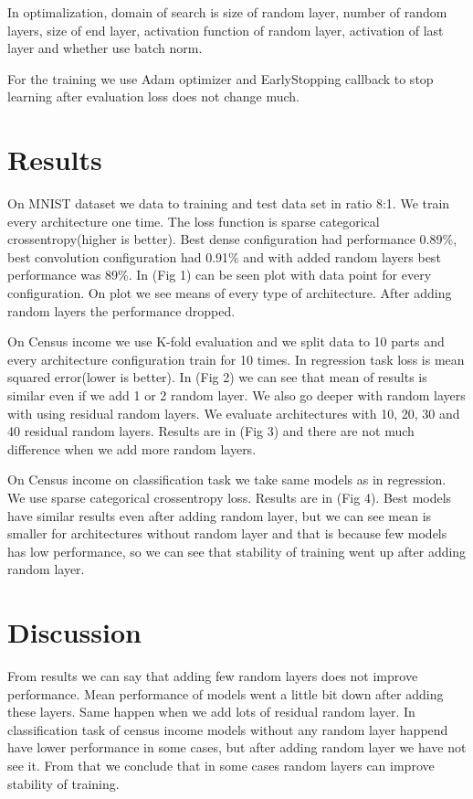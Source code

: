 \documentclass[]{article}
\begin{document}
\begin{multicols}{2}
	In optimalization, domain of search is size of random layer, number of random layers, size of end layer, activation function of random layer, activation of last layer and whether use batch norm.	
	
	For the training we use Adam optimizer and EarlyStopping callback to stop learning after evaluation loss does not change much.
	
	
	\section{Results}
	On MNIST dataset we data to training and test data set in ratio 8:1. We train every architecture one time. The loss function is sparse categorical crossentropy(higher is better). Best dense configuration had performance 0.89\%, best convolution configuration had 0.91\% and with added random layers best performance was 89\%. In (Fig 1) can be seen plot with data point for every configuration. On plot we see means of every type of architecture. After adding random layers the performance dropped.
	
	On Census income we use K-fold evaluation and we split data to 10 parts and every architecture configuration train for 10 times. In regression task loss is mean squared error(lower is better). In (Fig 2) we can see that mean of results is similar even if we add 1 or 2 random layer. We also go deeper with random layers with using residual random layers. We evaluate architectures with 10, 20, 30 and 40 residual random layers. Results are in (Fig 3) and there are not much difference when we add more random layers.
	
	On Census income on classification task we take same models as in regression. We use sparse categorical crossentropy loss. Results are in (Fig 4). Best models have similar results even after adding random layer, but we can see mean is smaller for architectures without random layer and that is because few models has low performance, so we can see that stability of training went up after adding random layer.
	
	\section{Discussion}
	From results we can say that adding few random layers does not improve performance. Mean performance of models went a little bit down after adding these layers. Same happen when we add lots of residual random layer. In classification task of census income models without any random layer happend have lower performance in some cases, but after adding random layer we have not see it. From that we conclude that in some cases random layers can improve stability of training.
	

\end{multicols}
\end{document}
